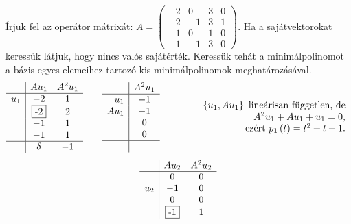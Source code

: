 \documentclass[9pt, a4paper, showtrims]{memoir}
\makeatletter
\renewenvironment{proof}[1][\proofname]
    {\par\pushQED{\qed}%
    \normalfont \topsep6\p@\@plus6\p@\relax
    \trivlist
    \item[\hskip\labelsep
        \itshape
    #1\@addpunct{:}]\ignorespaces}
    {\popQED\endtrivlist\@endpefalse}
\theoremstyle{plain}
\theoremstyle{remark}
\theoremstyle{definition}
\makeatother
\begin{document}
    \begin{proof}[Megoldás]
        Írjuk fel az operátor mátrixát:
        \(
        A=
        \begin{pmatrix}
            -2&0&3&0\\
            -2&-1&3&1\\
            -1&0&1&0\\
            -1&-1&3&0
        \end{pmatrix}.
        \)
        Ha a sajátvektorokat keressük látjuk, hogy nincs valós sajátérték.
        Keressük tehát a minimálpolinomot a bázis egyes elemeihez tartozó kis minimálpolinomok 
        meghatározásával.
        \[
            \begin{array}{r|cc}
                &Au_1&A^2u_1\\
                \hline
                u_1&-2&1\\
                &\framebox{-2}&2\\
                &-1&1\\
                &-1&1\\
                \hline
                &\delta&-1
            \end{array}
            \qquad
            \begin{array}{r|c}
                &A^2u_1\\
                \hline
                u_1&-1\\
                Au_1&-1\\
                & 0\\
                & 0\\
                \hline
                & 
            \end{array}
            \qquad\qquad
            \begin{array}{r}
                \left\{ u_1,Au_1 \right\}\mbox{ lineárisan független, de}\\
                A^2u_1+Au_1+u_1=0,\\
                \mbox{ezért } p_1\left( t \right)=t^2+t+1.
            \end{array}
        \]
        \[
            \begin{array}{r|cc}
                &Au_2&A^2u_2\\
                \hline
                &0 &0\\
                u_2&-1&0\\
                & 0&0\\
                &\framebox{-1}&1\\

\end{array}\]
\end{proof}
\end{document}

